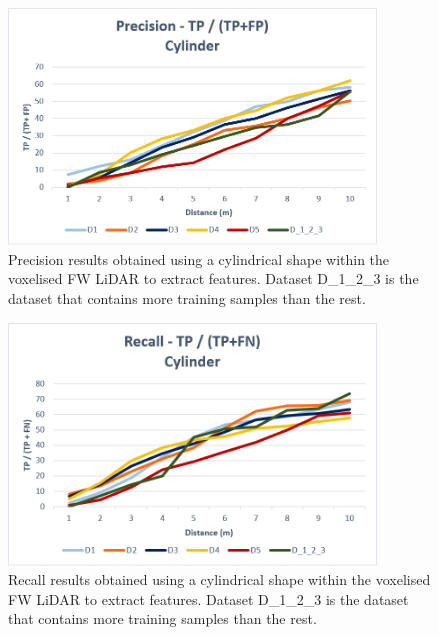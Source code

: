 \documentclass{subfiles}
\begin{document}
   \begin{figure} [h!]
   	\centering
   	\includegraphics[width=0.87\textwidth]{img/dead/results/Precision_Cylinder}
   	\caption[Precision results obtained using a cylindrical shape]{Precision results obtained using a cylindrical shape within the voxelised FW LiDAR to extract features. Dataset D\_1\_2\_3 is the dataset that contains more training samples than the rest.}
   	\label{fig:Precision_Cylinder}
   \end{figure}   
     \begin{figure} [h!]
     	\centering
     	\includegraphics[width=0.87\textwidth]{img/dead/results/Recall_Cylinder}
     	\caption[Recall results obtained using a cylindrical shape]{Recall results obtained using a cylindrical shape within the voxelised FW LiDAR to extract features. Dataset D\_1\_2\_3 is the dataset that contains more training samples than the rest.}
     	\label{fig:Recall_Cylinder}
     \end{figure}
     
\end{document}
